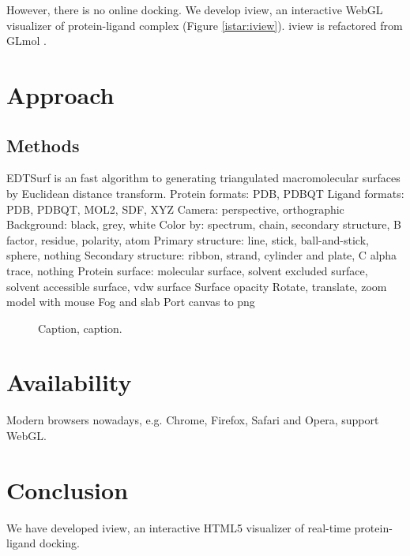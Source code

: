 \documentclass{bioinfo}
\begin{document}
However, there is no online docking. We develop iview, an interactive WebGL visualizer of protein-ligand complex (Figure \ref{istar:iview}). iview is refactored from GLmol \citep{1319}.

\section{Approach}


\begin{methods}
\section{Methods}

EDTSurf \citep{1297} is an fast algorithm to generating triangulated macromolecular surfaces by Euclidean distance transform.
Protein formats: PDB, PDBQT
Ligand formats: PDB, PDBQT, MOL2, SDF, XYZ
Camera: perspective, orthographic
Background: black, grey, white
Color by: spectrum, chain, secondary structure, B factor, residue, polarity, atom
Primary structure: line, stick, ball-and-stick, sphere, nothing
Secondary structure: ribbon, strand, cylinder and plate, C alpha trace, nothing
Protein surface: molecular surface, solvent excluded surface, solvent accessible surface, vdw surface
Surface opacity
Rotate, translate, zoom model with mouse
Fog and slab
Port canvas to png

\end{methods}

\begin{figure}[!tpb]%
\caption{Caption, caption.}\label{fig:01}
\end{figure}

\section{Availability}

Modern browsers nowadays, e.g. Chrome, Firefox, Safari and Opera, support WebGL.

\section{Conclusion}

We have developed iview, an interactive HTML5 visualizer of real-time protein-ligand docking.


%
%
%
%
%
%


\end{document}
